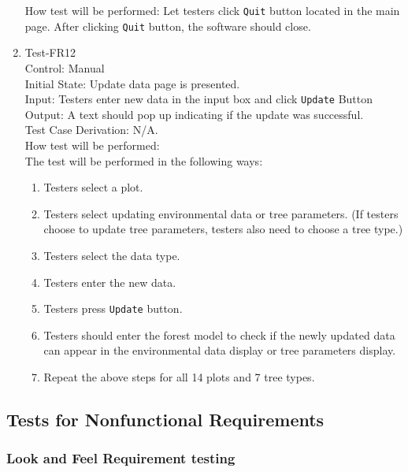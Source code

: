 \documentclass[12pt, titlepage]{article}
\begin{document}
\begin{enumerate}
How test will be performed:  Let testers click \verb|Quit| button 
located in the main page. After clicking \verb|Quit| button, the
software should close.

\item{Test-FR12\\}
Control: Manual\\ 

Initial State: Update data page is presented.\\

Input: Testers enter new data in the input box and click \verb|Update| Button\\

Output: A text should pop up indicating if the update was successful.\\

Test Case Derivation: N/A.\\
					
How test will be performed: \\ The test will be performed in the following ways:
\begin{enumerate}[1.]
\item Testers select a plot.
\item Testers select updating environmental data or tree parameters. (If testers
choose to update tree parameters, testers also need to choose a tree type.)
\item Testers select the data type.
\item Testers enter the new data.
\item Testers press \verb|Update| button.
\item Testers should enter the forest model to check if the newly updated data can 
appear in the environmental data display or tree parameters display. 
\item Repeat the above steps for all 14 plots and 7 tree types.
\end{enumerate}
\end{enumerate}


\subsection{Tests for Nonfunctional Requirements}

\subsubsection{Look and Feel Requirement testing}
\end{document}
